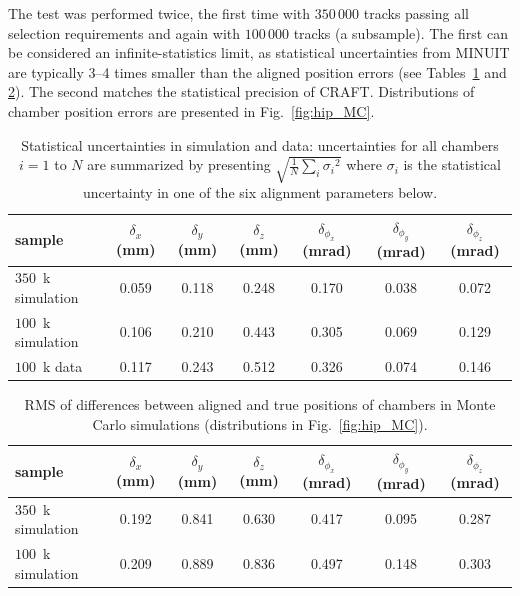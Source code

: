 The test was performed twice, the first time with $350\,000$ tracks
passing all selection requirements and again with $100\,000$ tracks (a
subsample).  The first can be considered an infinite-statistics limit,
as statistical uncertainties from MINUIT are typically 3--4 times
smaller than the aligned position errors (see
Tables~\ref{tab:staterrs} and \ref{tab:hip_MC}).  The second matches
the statistical precision of CRAFT.  Distributions of chamber position
errors are presented in Fig.~\ref{fig:hip_MC}.

\begin{table}[p]
\caption{Statistical uncertainties in simulation and data:
uncertainties for all chambers $i=1$ to $N$ are summarized by
presenting $\sqrt{\frac{1}{N} \sum_i {\sigma_i}^2}$ where $\sigma_i$
is the statistical uncertainty in one of the six alignment parameters
below. \label{tab:staterrs}}
\begin{center}
\renewcommand{\arraystretch}{1.5}
\begin{tabular}{l | c c c c c c}
\hline\hline sample & $\delta_x$ (mm) & $\delta_y$ (mm) & $\delta_z$ (mm) & $\delta_{\phi_x}$ (mrad) & $\delta_{\phi_y}$ (mrad) & $\delta_{\phi_z}$ (mrad) \\\hline
$350$~k simulation & 0.059 & 0.118 & 0.248 & 0.170 & 0.038 & 0.072 \\\hline
$100$~k simulation & 0.106 & 0.210 & 0.443 & 0.305 & 0.069 & 0.129 \\
$100$~k data & 0.117 & 0.243 & 0.512 & 0.326 & 0.074 & 0.146 \\\hline\hline
\end{tabular}
\end{center}
\end{table}

\begin{table}[p]
\caption{RMS of differences between aligned and true positions of
chambers in Monte Carlo simulations (distributions in Fig.~\ref{fig:hip_MC}).  \label{tab:hip_MC}}
\renewcommand{\arraystretch}{1.5}
\begin{center}
\begin{tabular}{l | c c c c c c}
\hline\hline sample & $\delta_x$ (mm) & $\delta_y$ (mm) & $\delta_z$ (mm) & $\delta_{\phi_x}$ (mrad) & $\delta_{\phi_y}$ (mrad) & $\delta_{\phi_z}$ (mrad) \\\hline
$350$~k simulation & 0.192 & 0.841 & 0.630 & 0.417 & 0.095 & 0.287 \\
$100$~k simulation & 0.209 & 0.889 & 0.836 & 0.497 & 0.148 & 0.303 \\\hline\hline
\end{tabular}
\end{center}
\end{table}

